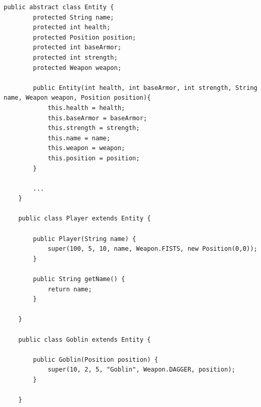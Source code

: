 \vspace{0.5cm}
\begin{lstlisting}[caption={Don't Repeat Yourself (Nachher)}]
    public abstract class Entity {
        protected String name;
        protected int health;
        protected Position position;
        protected int baseArmor;
        protected int strength;
        protected Weapon weapon;
     
        public Entity(int health, int baseArmor, int strength, String name, Weapon weapon, Position position){
            this.health = health;
            this.baseArmor = baseArmor;
            this.strength = strength;
            this.name = name;
            this.weapon = weapon;
            this.position = position;
        }
     
        ...
    }

    public class Player extends Entity {

        public Player(String name) {
            super(100, 5, 10, name, Weapon.FISTS, new Position(0,0));
        }

        public String getName() {
            return name;
        }

    }

    public class Goblin extends Entity {

        public Goblin(Position position) {
            super(10, 2, 5, "Goblin", Weapon.DAGGER, position);
        }

    }

\end{lstlisting}